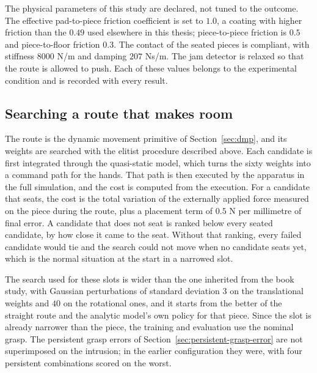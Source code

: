 The physical parameters of this study are declared, not tuned to the outcome. The effective pad-to-piece friction coefficient is set to $1.0$, a coating with higher friction than the $0.49$ used elsewhere in this thesis; piece-to-piece friction is $0.5$ and piece-to-floor friction $0.3$. The contact of the seated pieces is compliant, with stiffness $8000$ N/m and damping $207$ Ns/m. The jam detector is relaxed so that the route is allowed to push. Each of these values belongs to the experimental condition and is recorded with every result.

\subsection{Searching a route that makes room}

The route is the dynamic movement primitive of Section~\ref{sec:dmp}, and its weights are searched with the elitist procedure described above. Each candidate is first integrated through the quasi-static model, which turns the sixty weights into a command path for the hands. That path is then executed by the apparatus in the full simulation, and the cost is computed from the execution. For a candidate that seats, the cost is the total variation of the externally applied force measured on the piece during the route, plus a placement term of $0.5$ N per millimetre of final error. A candidate that does not seat is ranked below every seated candidate, by how close it came to the seat. Without that ranking, every failed candidate would tie and the search could not move when no candidate seats yet, which is the normal situation at the start in a narrowed slot.

The search used for these slots is wider than the one inherited from the book study, with Gaussian perturbations of standard deviation $3$ on the translational weights and $40$ on the rotational ones, and it starts from the better of the straight route and the analytic model's own policy for that piece. Since the slot is already narrower than the piece, the training and evaluation use the nominal grasp. The persistent grasp errors of Section~\ref{sec:persistent-grasp-error} are not superimposed on the intrusion; in the earlier configuration they were, with four persistent combinations scored on the worst.


